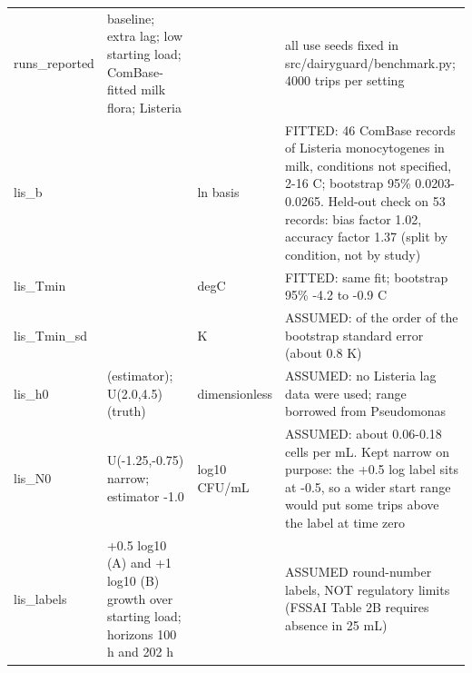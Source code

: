 {{\begin{longtable}{@{}>{\raggedright\arraybackslash}p{2.7cm}>{\raggedright\arraybackslash}p{2.9cm}>{\raggedright\arraybackslash}p{1.6cm}>{\raggedright\arraybackslash}p{6.6cm}@{}}
runs\_\allowbreak{}reported & baseline; extra lag; low starting load; ComBase-fitted milk flora; Listeria &  & all use seeds fixed in src/dairyguard/benchmark.py; 4000 trips per setting\\
lis\_\allowbreak{}b & 0.0235 & ln basis & FITTED: 46 ComBase records of Listeria monocytogenes in milk, conditions not specified, 2-16 C; bootstrap 95\% 0.0203-0.0265. Held-out check on 53 records: bias factor 1.02, accuracy factor 1.37 (split by condition, not by study)\\
lis\_\allowbreak{}Tmin & -2.3 & degC & FITTED: same fit; bootstrap 95\% -4.2 to -0.9 C\\
lis\_\allowbreak{}Tmin\_\allowbreak{}sd & 1.0 & K & ASSUMED: of the order of the bootstrap standard error (about 0.8 K)\\
lis\_\allowbreak{}h0 & 3.0 (estimator); U(2.0,4.5) (truth) & dimensionless & ASSUMED: no Listeria lag data were used; range borrowed from Pseudomonas\\
lis\_\allowbreak{}N0 & U(-1.25,-0.75) narrow; estimator -1.0 & log10 CFU/mL & ASSUMED: about 0.06-0.18 cells per mL. Kept narrow on purpose: the +0.5 log label sits at -0.5, so a wider start range would put some trips above the label at time zero\\
lis\_\allowbreak{}labels & +0.5 log10 (A) and +1 log10 (B) growth over starting load; horizons 100 h and 202 h &  & ASSUMED round-number labels, NOT regulatory limits (FSSAI Table 2B requires absence in 25 mL)\\
\end{longtable}}}

